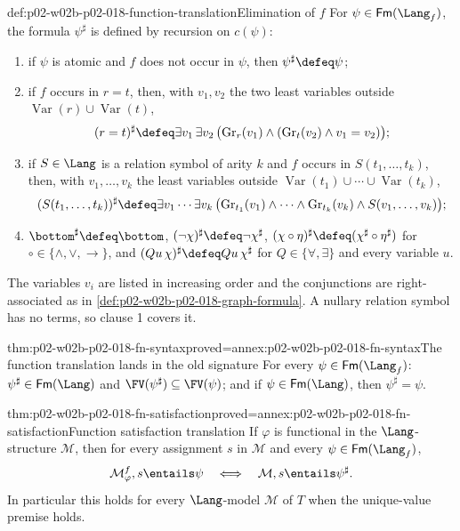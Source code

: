 \begin{hbdefinition}{def:p02-w02b-p02-018-function-translation}{Elimination of \(f\)}
For \(\psi\in\mathsf{Fm}(\Lang_f)\), the formula \(\psi^{\sharp}\) is
defined by recursion on \(c(\psi)\):
\begin{enumerate}
 \item if \(\psi\) is atomic and \(f\) does not occur in \(\psi\), then
       \(\psi^{\sharp}\defeq\psi\);
 \item if \(f\) occurs in \(r=t\), then, with \(v_1,v_2\) the two least
       variables outside \(\operatorname{Var}(r)\cup\operatorname{Var}(t)\),
       \[
        (r=t)^{\sharp}\defeq\exists v_1\,\exists v_2\,
        \bigl(\operatorname{Gr}_{r}(v_1)\land(\operatorname{Gr}_{t}(v_2)
        \land v_1=v_2)\bigr);
       \]
 \item if \(S\in\Lang\) is a relation symbol of arity \(k\) and \(f\) occurs
       in \(S(t_1,\ldots,t_k)\), then, with \(v_1,\ldots,v_k\) the least
       variables outside
       \(\operatorname{Var}(t_1)\cup\cdots\cup\operatorname{Var}(t_k)\),
       \[
        (S(t_1,\ldots,t_k))^{\sharp}\defeq
        \exists v_1\cdots\exists v_k\,
        \bigl(\operatorname{Gr}_{t_1}(v_1)\land\cdots\land
        \operatorname{Gr}_{t_k}(v_k)\land S(v_1,\ldots,v_k)\bigr);
       \]
 \item \(\bottom^{\sharp}\defeq\bottom\),
       \((\neg\chi)^{\sharp}\defeq\neg\chi^{\sharp}\),
       \((\chi\circ\eta)^{\sharp}\defeq(\chi^{\sharp}\circ\eta^{\sharp})\) for
       \(\circ\in\{\land,\lor,\to\}\), and
       \((Qu\,\chi)^{\sharp}\defeq Qu\,\chi^{\sharp}\) for
       \(Q\in\{\forall,\exists\}\) and every variable \(u\).
\end{enumerate}
The variables \(v_i\) are listed in increasing order and the conjunctions
are right-associated as in \cref{def:p02-w02b-p02-018-graph-formula}.  A
nullary relation symbol has no terms, so clause 1 covers it.
\end{hbdefinition}

\begin{hblemma}{thm:p02-w02b-p02-018-fn-syntax}{proved=annex:p02-w02b-p02-018-fn-syntax}{The function translation lands in the old signature}
For every \(\psi\in\mathsf{Fm}(\Lang_f)\): \(\psi^{\sharp}\in\mathsf{Fm}(\Lang)\)
and \(\FV(\psi^{\sharp})\subseteq\FV(\psi)\); and if
\(\psi\in\mathsf{Fm}(\Lang)\), then \(\psi^{\sharp}=\psi\).
\end{hblemma}

\begin{hbtheorem}{thm:p02-w02b-p02-018-fn-satisfaction}{proved=annex:p02-w02b-p02-018-fn-satisfaction}{Function satisfaction translation}
If \(\varphi\) is functional in the \(\Lang\)-structure \(\mathcal M\), then
for every assignment \(s\) in \(\mathcal M\) and every
\(\psi\in\mathsf{Fm}(\Lang_f)\),
\[
 \mathcal M^{f}_{\varphi},s\entails\psi
 \quad\Longleftrightarrow\quad
 \mathcal M,s\entails\psi^{\sharp}.
\]
In particular this holds for every \(\Lang\)-model \(\mathcal M\) of \(T\)
when the unique-value premise holds.
\end{hbtheorem}

